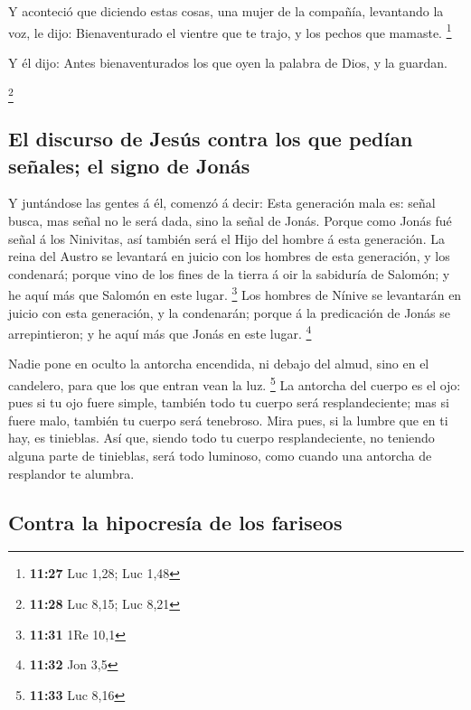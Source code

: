  Y aconteció que diciendo estas cosas, una mujer de la
compañía, levantando la voz, le dijo: Bienaventurado el vientre que te
trajo, y los pechos que mamaste. \footnote{\textbf{11:27} Luc 1,28; Luc
  1,48}

 Y él dijo: Antes bienaventurados los que oyen la palabra
de Dios, y la guardan.

\footnote{\textbf{11:28} Luc 8,15; Luc 8,21}

\hypertarget{el-discurso-de-jesuxfas-contra-los-que-peduxedan-seuxf1ales-el-signo-de-jonuxe1s}{%
\subsection{El discurso de Jesús contra los que pedían señales; el signo
de
Jonás}\label{el-discurso-de-jesuxfas-contra-los-que-peduxedan-seuxf1ales-el-signo-de-jonuxe1s}}

 Y juntándose las gentes á él, comenzó á decir: Esta
generación mala es: señal busca, mas señal no le será dada, sino la
señal de Jonás.  Porque como Jonás fué señal á los
Ninivitas, así también será el Hijo del hombre á esta generación.
 La reina del Austro se levantará en juicio con los
hombres de esta generación, y los condenará; porque vino de los fines de
la tierra á oir la sabiduría de Salomón; y he aquí más que Salomón en
este lugar. \footnote{\textbf{11:31} 1Re 10,1}  Los
hombres de Nínive se levantarán en juicio con esta generación, y la
condenarán; porque á la predicación de Jonás se arrepintieron; y he aquí
más que Jonás en este lugar. \footnote{\textbf{11:32} Jon 3,5}

 Nadie pone en oculto la antorcha encendida, ni debajo
del almud, sino en el candelero, para que los que entran vean la luz.
\footnote{\textbf{11:33} Luc 8,16}  La antorcha del
cuerpo es el ojo: pues si tu ojo fuere simple, también todo tu cuerpo
será resplandeciente; mas si fuere malo, también tu cuerpo será
tenebroso.  Mira pues, si la lumbre que en ti hay, es
tinieblas.  Así que, siendo todo tu cuerpo
resplandeciente, no teniendo alguna parte de tinieblas, será todo
luminoso, como cuando una antorcha de resplandor te alumbra.

\hypertarget{contra-la-hipocresuxeda-de-los-fariseos}{%
\subsection{Contra la hipocresía de los
fariseos}\label{contra-la-hipocresuxeda-de-los-fariseos}}

